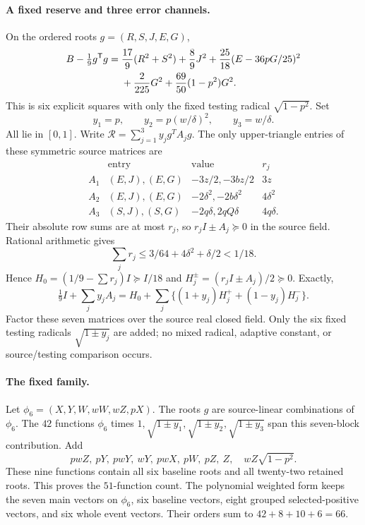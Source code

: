 \documentclass[11pt]{article}
\begin{document}
\paragraph{A fixed reserve and three error channels.}
On the ordered roots $g=(R,S,J,E,G)$,
\[
\begin{split}
 B-\tfrac19g^{\mathsf T}g={}&{17\over9}(R^2+S^2)+{8\over9}J^2
 +{25\over18}(E-36pG/25)^2\\
 &+{2\over225}G^2+{69\over50}(1-p^2)G^2.
\end{split}
\]
This is six explicit squares with only the fixed testing radical
$\sqrt{1-p^2}$. Set
\[
 y_1=p,\qquad y_2=p(w/\delta)^2,\qquad y_3=w/\delta.
\]
All lie in $[0,1]$. Write $\mathcal R=\sum_{j=1}^3y_jg^TA_jg$.
The only upper-triangle entries of these symmetric source matrices are
\[
\begin{array}{c|cc|c}
 &\text{entry}&\text{value}&r_j\\\hline
 A_1&(E,J),(E,G)&-3z/2,-3bz/2&3z\\
 A_2&(E,J),(E,G)&-2\delta^2,-2b\delta^2&4\delta^2\\
 A_3&(S,J),(S,G)&-2q\delta,2qQ\delta&4q\delta.
\end{array}
\]
Their absolute row sums are at most $r_j$, so $r_jI\pm A_j\succeq0$
in the source field. Rational arithmetic gives
\[
 \sum_jr_j\le3/64+4\delta^2+\delta/2<1/18.
\]
Hence $H_0=(1/9-\sum r_j)I\succeq I/18$ and
$H_j^\pm=(r_jI\pm A_j)/2\succeq0$. Exactly,
\[
 \tfrac19I+\sum_j y_jA_j
   =H_0+\sum_j\{(1+y_j)H_j^++(1-y_j)H_j^-\}.
\]
Factor these seven matrices over the source real closed field.
Only the six fixed testing radicals $\sqrt{1\pm y_j}$ are added;
no mixed radical, adaptive constant, or source/testing comparison occurs.

\paragraph{The fixed family.}
Let $\phi_6=(X,Y,W,wW,wZ,pX)$. The roots $g$ are source-linear
combinations of $\phi_6$. The $42$ functions $\phi_6$ times
$1,\sqrt{1\pm y_1},\sqrt{1\pm y_2},\sqrt{1\pm y_3}$ span this
seven-block contribution. Add
\[
 pwZ,\ pY,\ pwY,\ wY,\ pwX,\ pW,\ pZ,\ Z,
                         \quad wZ\sqrt{1-p^2}.
\]
These nine functions contain all six baseline roots and all twenty-two
retained roots. This proves the $51$-function count. The polynomial
weighted form keeps the seven main vectors on $\phi_6$, six baseline
vectors, eight grouped selected-positive vectors, and six whole event
vectors. Their orders sum to $42+8+10+6=66$.
\end{document}
